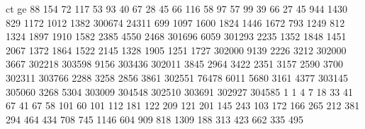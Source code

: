 ct ge
88 154
72 117
53 93
40 67
28 45
66 116
58 97
57 99
39 66
27 45
944 1430
829 1172
1012 1382
300674 24311
699 1097
1600 1824
1446 1672
793 1249
812 1324
1897 1910
1582 2385
4550 2468
301696 6059
301293 2235
1352 1848
1451 2067
1372 1864
1522 2145
1328 1905
1251 1727
302000 9139
2226 3212
302000 3667
302218 303598
9156 303436
302011 3845
2964 3422
2351 3157
2590 3700
302311 303766
2288 3258
2856 3861
302551 76478
6011 5680
3161 4377
303145 305060
3268 5304
303009 304548
302510 303691
302927 304585
1 1
4 7
18 33
41 67
41 67
58 101
60 101
112 181
122 209
121 201
145 243
103 172
166 265
212 381
294 464
434 708
745 1146
604 909
818 1309
188 313
423 662
335 495

